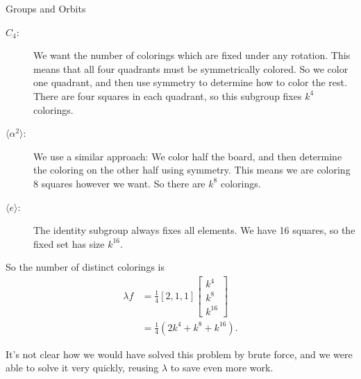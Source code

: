 \documentclass[12pt]{pom_thesis}
\begin{document}
\begin{chapter}{Groups and Orbits}
\begin{examp}
\begin{description}
\item[$C_4$:] We want the number of colorings which are fixed under any rotation. This means that all four quadrants must be symmetrically colored. So we color one quadrant, and then use symmetry to determine how to color the rest. There are four squares in each quadrant, so this subgroup fixes $k^4$ colorings.
\item[$\langle \alpha^2 \rangle$:] We use a similar approach: We color half the board, and then determine the coloring on the other half using symmetry. This means we are coloring 8 squares however we want. So there are $k^8$ colorings.
\item[$\langle e \rangle$:] The identity subgroup always fixes all elements. We have 16 squares, so the fixed set has size $k^{16}$.
\end{description}
So the number of distinct colorings is
\begin{align*}
\lambda f &= \frac 14 [2,1,1]\begin{bmatrix} k^4 \\ k^8 \\ k^{16}\end{bmatrix}\\
&= \frac 14 (2k^4 + k^8 + k^{16}).
\end{align*}
\end{examp}
It's not clear how we would have solved this problem by brute force, and we were able to solve it very quickly, reusing $\lambda$ to save even more work.
\end{chapter}
\end{document}
